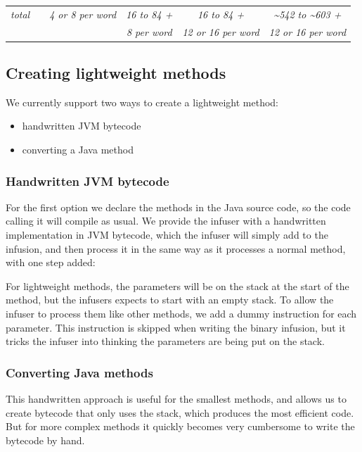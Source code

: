 \begin{table}
{\begin{tabular}{lccccc}
    \\
    \emph{total}                                              &                 & \emph{4 or 8 per word}  & \emph{16 to 84 +}           & \emph{16 to 84 +}           & \emph{\textasciitilde 542 to \textasciitilde 603 +} \\
                                                              &                 &                         & \emph{8 per word}           & \emph{12 or 16 per word}    & \emph{12 or 16 per word}                            \\
    \bottomrule
    \end{tabular}
    }
\end{table}

\subsection{Creating lightweight methods}
We currently support two ways to create a lightweight method:
\begin{itemize}
	\item handwritten JVM bytecode
	\item converting a Java method 
\end{itemize}

\subsubsection{Handwritten JVM bytecode}
For the first option we declare the methods  in the Java source code, so the code calling it will compile as usual. We provide the infuser with a handwritten implementation in JVM bytecode, which the infuser will simply add to the infusion, and then process it in the same way as it processes a normal method, with one step added:

For lightweight methods, the parameters will be on the stack at the start of the method, but the infusers expects to start with an empty stack. To allow the infuser to process them like other methods, we add a dummy  instruction for each parameter. This instruction is skipped when writing the binary infusion, but it tricks the infuser into thinking the parameters are being put on the stack.


\subsubsection{Converting Java methods}
This handwritten approach is useful for the smallest methods, and allows us to create bytecode that only uses the stack, which produces the most efficient code. But for more complex methods it quickly becomes very cumbersome to write the bytecode by hand.

